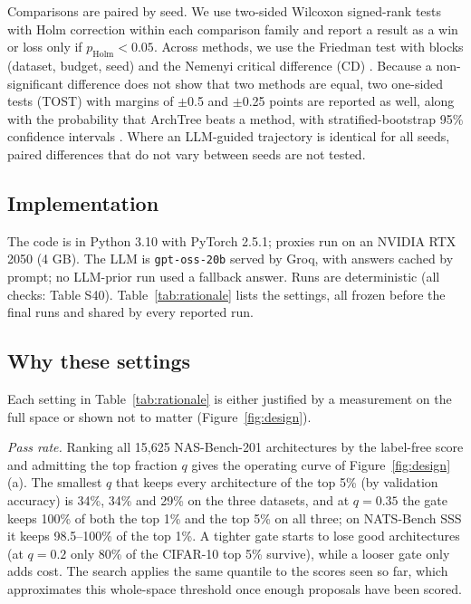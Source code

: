 \documentclass{sadhana}
\newcommand{\algname}{ArchTree}
\begin{document}
Comparisons are paired by seed. We use two-sided Wilcoxon signed-rank tests \cite{wilcoxon1945} with Holm correction \cite{holm1979} within each comparison family and report a result as a win or loss only if $p_{\mathrm{Holm}}<0.05$. Across methods, we use the Friedman test with blocks (dataset, budget, seed) and the Nemenyi critical difference (CD) \cite{demsar2006}. Because a non-significant difference does not show that two methods are equal, two one-sided tests (TOST) \cite{schuirmann1987} with margins of $\pm$0.5 and $\pm$0.25 points are reported as well, along with the probability that \algname{} beats a method, with stratified-bootstrap 95\% confidence intervals \cite{agarwal2021}. Where an LLM-guided trajectory is identical for all seeds, paired differences that do not vary between seeds are not tested.

\subsection{Implementation}

The code is in Python 3.10 with PyTorch 2.5.1; proxies run on an NVIDIA RTX 2050 (4 GB). The LLM is \texttt{gpt-oss-20b} \cite{openai2025gptoss} served by Groq, with answers cached by prompt; no LLM-prior run used a fallback answer. Runs are deterministic (all checks: Table S40). Table~\ref{tab:rationale} lists the settings, all frozen before the final runs and shared by every reported run.


\subsection{Why these settings}\label{sec:rationale}

Each setting in Table~\ref{tab:rationale} is either justified by a measurement on the full space or shown not to matter (Figure~\ref{fig:design}).

\textit{Pass rate.} Ranking all 15,625 NAS-Bench-201 architectures by the label-free score and admitting the top fraction $q$ gives the operating curve of Figure~\ref{fig:design}(a). The smallest $q$ that keeps every architecture of the top 5\% (by validation accuracy) is 34\%, 34\% and 29\% on the three datasets, and at $q=0.35$ the gate keeps 100\% of both the top 1\% and the top 5\% on all three; on NATS-Bench SSS it keeps 98.5--100\% of the top 1\%. A tighter gate starts to lose good architectures (at $q=0.2$ only 80\% of the CIFAR-10 top 5\% survive), while a looser gate only adds cost. The search applies the same quantile to the scores seen so far, which approximates this whole-space threshold once enough proposals have been scored.
\end{document}
